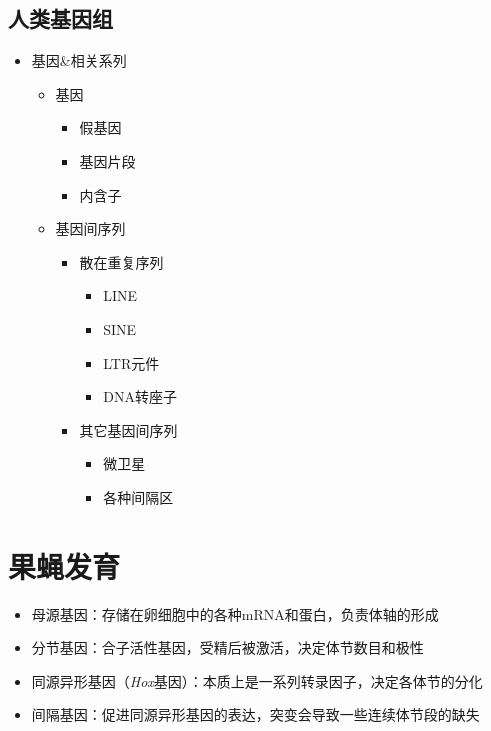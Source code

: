 \documentclass[a4paper, 12pt]{report}
\begin{document}
\section{人类基因组}
\begin{itemize}
    \item 基因\&相关系列
          \begin{itemize}
              \item 基因
                    \begin{itemize}
                        \item 假基因
                        \item 基因片段
                        \item 内含子
                    \end{itemize}
              \item 基因间序列
                    \begin{itemize}
                        \item 散在重复序列
                              \begin{itemize}
                                  \item LINE
                                  \item SINE
                                  \item LTR元件
                                  \item DNA转座子
                              \end{itemize}
                        \item 其它基因间序列
                              \begin{itemize}
                                  \item 微卫星
                                  \item 各种间隔区
                              \end{itemize}
                    \end{itemize}
          \end{itemize}
\end{itemize}
\chapter{
  果蝇发育
 }
\begin{itemize}
    \item 母源基因：存储在卵细胞中的各种mRNA和蛋白，负责体轴的形成
    \item 分节基因：合子活性基因，受精后被激活，决定体节数目和极性
    \item 同源异形基因（\textit{Hox}基因）：本质上是一系列转录因子，决定各体节的分化
    \item 间隔基因：促进同源异形基因的表达，突变会导致一些连续体节段的缺失
\end{itemize}
\end{document}
